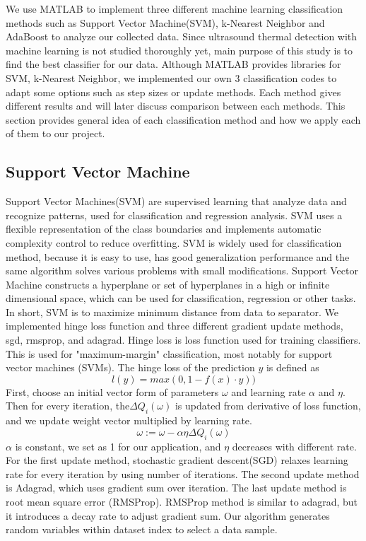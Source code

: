 \documentclass[11pt,letterpaper]{article}
\begin{document}
We use MATLAB to implement three different machine learning classification methods such as Support Vector Machine(SVM), k-Nearest Neighbor and AdaBoost to analyze our collected data. Since ultrasound thermal detection with machine learning is not studied thoroughly yet, main purpose of this study is to find the best classifier for our data. Although MATLAB provides libraries for SVM, k-Nearest Neighbor, we implemented our own 3 classification codes to adapt some options such as step sizes or update methods. Each method gives different results and will later discuss comparison between each methods. This section provides general idea of each classification method and how we apply each of them to our project.

\subsection{Support Vector Machine}
\label{sect:pdf}
Support Vector Machines(SVM) are supervised learning that analyze data and recognize patterns, used for classification and regression analysis. SVM uses a flexible representation of the class boundaries and implements automatic complexity control to reduce overfitting. SVM is widely used for classification method, because it is easy to use, has good generalization performance and the same algorithm solves various problems with small modifications. Support Vector Machine constructs a hyperplane or set of hyperplanes in a high or infinite dimensional space, which can be used for classification, regression or other tasks. In short, SVM is to maximize minimum distance from data to separator. We implemented hinge loss function and three different gradient update methods, sgd, rmsprop, and adagrad. Hinge loss is loss function used for training classifiers. This is used for "maximum-margin" classification, most notably for support vector machines (SVMs). The hinge loss of the prediction $y$ is defined as $$ l(y) = max(0, 1 - f(x) \cdot y))$$  First, choose an initial vector form of parameters $\omega$ and learning rate $\alpha$ and $\eta$. Then for every iteration, the$\Delta Q_{i}(\omega)$ is updated from derivative of loss function, and we update weight vector multiplied by learning rate.  $$ \omega := \omega - \alpha \eta\Delta Q_{i}(\omega) $$ $\alpha$ is constant, we set as 1 for our application, and $\eta$ decreases with different rate. For the first update method, stochastic gradient descent(SGD) relaxes learning rate for every iteration by using number of iterations. The second update method is Adagrad, which uses gradient sum over iteration. The last update method is root mean square error (RMSProp). RMSProp method is similar to adagrad, but it introduces a decay rate to adjust gradient sum. Our algorithm generates random variables within dataset index to select a data sample. 
\end{document}
